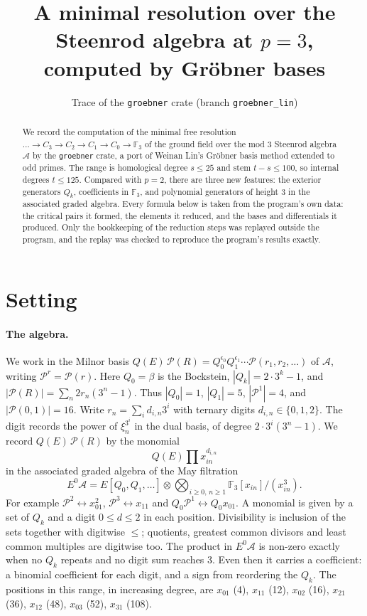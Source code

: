 \documentclass[11pt]{article}
\title{A minimal resolution over the Steenrod algebra at $p = 3$,\\ computed by Gröbner bases}
\author{Trace of the \texttt{groebner} crate (branch \texttt{groebner\_lin})}
\date{}
\renewcommand{\P}{\mathcal{P}}
\newcommand{\F}{\mathbb{F}_3}
\newcommand{\A}{\mathcal{A}}
\begin{document}
\maketitle

\begin{abstract}
We record the computation of the minimal free resolution
$\dots \to C_3 \to C_2 \to C_1 \to C_0 \to \F$ of the ground field over the mod $3$ Steenrod
algebra $\A$ by the \texttt{groebner} crate, a port of Weinan Lin's Gröbner basis method
extended to odd primes. The range is homological degree $s \le 25$ and stem $t - s \le 100$, so
internal degrees $t \le 125$. Compared with $p = 2$, there are three new features: the exterior
generators $Q_k$, coefficients in $\F$, and polynomial generators of height $3$ in the
associated graded algebra. Every formula below is taken from the program's own data: the
critical pairs it formed, the elements it reduced, and the bases and differentials it
produced. Only the bookkeeping of the reduction steps was replayed outside the program, and the
replay was checked to reproduce the program's results exactly.
\end{abstract}

\section{Setting}

\paragraph{The algebra.}
We work in the Milnor basis $Q(E)\,\P(R) = Q_0^{\epsilon_0}Q_1^{\epsilon_1}\cdots
\P(r_1, r_2, \dots)$ of $\A$, writing $\P^r = \P(r)$. Here $Q_0 = \beta$ is the Bockstein,
$|Q_k| = 2\cdot 3^k - 1$, and $|\P(R)| = \sum_n 2 r_n (3^n - 1)$. Thus $|Q_0| = 1$, $|Q_1| = 5$,
$|\P^1| = 4$, and $|\P(0,1)| = 16$. Write $r_n = \sum_i d_{i,n} 3^i$ with ternary digits
$d_{i,n} \in \{0, 1, 2\}$. The digit records the power of $\xi_n^{3^i}$ in the dual basis,
of degree $2\cdot 3^i(3^n - 1)$. We record $Q(E)\,\P(R)$ by the monomial
\[ Q(E) \prod x_{in}^{d_{i,n}} \]
in the associated graded algebra of the May filtration
\[ E^0\A = E[Q_0, Q_1, \dots] \otimes \bigotimes_{i \ge 0,\, n \ge 1} \F[x_{in}]/(x_{in}^3). \]
For example $\P^2 \leftrightarrow x_{01}^2$, $\P^3 \leftrightarrow x_{11}$ and
$Q_0\P^1 \leftrightarrow Q_0x_{01}$. A monomial is given by a set of $Q_k$ and a digit
$0 \le d \le 2$ in each position. Divisibility is inclusion of the sets together with digitwise
$\le$; quotients, greatest common divisors and least common multiples are digitwise too. The
product in $E^0\A$ is non-zero exactly when no $Q_k$ repeats and no digit sum reaches $3$. Even
then it carries a coefficient: a binomial coefficient for each digit, and a sign from
reordering the $Q_k$. The positions in this range, in increasing degree, are $x_{01}$ (4), $x_{11}$ (12), $x_{02}$ (16), $x_{21}$ (36), $x_{12}$ (48), $x_{03}$ (52), $x_{31}$ (108).
\end{document}
